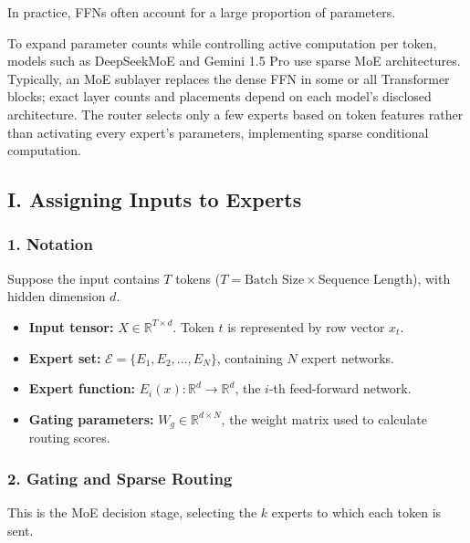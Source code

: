 In practice, FFNs often account for a large proportion of parameters.

To expand parameter counts while controlling active computation per token, models such as DeepSeekMoE and Gemini 1.5 Pro use sparse MoE architectures. Typically, an MoE sublayer replaces the dense FFN in some or all Transformer blocks; exact layer counts and placements depend on each model's disclosed architecture. The router selects only a few experts based on token features rather than activating every expert's parameters, implementing sparse conditional computation.

\hypertarget{i.-assigning-inputs-to-experts}{%
\subsection{I. Assigning Inputs to Experts}\label{i.-assigning-inputs-to-experts}}

\hypertarget{notation}{%
\subsubsection{1. Notation}\label{notation}}

Suppose the input contains \(T\) tokens (\(T=\text{Batch Size} \times \text{Sequence Length}\)), with hidden dimension \(d\).

\begin{itemize}
\tightlist
\item
  \textbf{Input tensor:} \(X \in \mathbb{R}^{T \times d}\). Token \(t\) is represented by row vector \(x_t\).
\item
  \textbf{Expert set:} \(\mathcal{E}=\{E_1,E_2,\ldots,E_N\}\), containing \(N\) expert networks.
\item
  \textbf{Expert function:} \(E_i(x): \mathbb{R}^d \to \mathbb{R}^d\), the \(i\)-th feed-forward network.
\item
  \textbf{Gating parameters:} \(W_g \in \mathbb{R}^{d \times N}\), the weight matrix used to calculate routing scores.
\end{itemize}

\hypertarget{gating-and-sparse-routing}{%
\subsubsection{2. Gating and Sparse Routing}\label{gating-and-sparse-routing}}

This is the MoE decision stage, selecting the \(k\) experts to which each token is sent.

